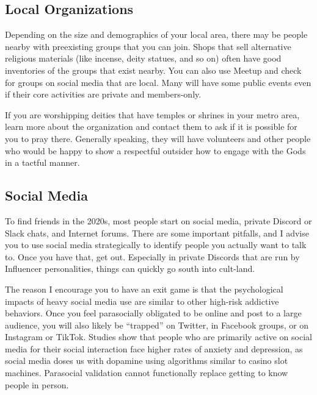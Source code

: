 \documentclass[
]{book}
\begin{document}
\hypertarget{local-organizations}{%
\subsection{Local Organizations}\label{local-organizations}}

Depending on the size and demographics of your local area, there may be people nearby with preexisting groups that you can join. Shops that sell alternative religious materials (like incense, deity statues, and so on) often have good inventories of the groups that exist nearby. You can also use Meetup and check for groups on social media that are local. Many will have some public events even if their core activities are private and members-only.

If you are worshipping deities that have temples or shrines in your metro area, learn more about the organization and contact them to ask if it is possible for you to pray there. Generally speaking, they will have volunteers and other people who would be happy to show a respectful outsider how to engage with the Gods in a tactful manner.

\hypertarget{social-media}{%
\subsection{Social Media}\label{social-media}}

To find friends in the 2020s, most people start on social media, private Discord or Slack chats, and Internet forums. There are some important pitfalls, and I advise you to use social media strategically to identify people you actually want to talk to. Once you have that, get out. Especially in private Discords that are run by Influencer personalities, things can quickly go south into cult-land.

The reason I encourage you to have an exit game is that the psychological impacts of heavy social media use are similar to other high-risk addictive behaviors. Once you feel parasocially obligated to be online and post to a large audience, you will also likely be ``trapped'' on Twitter, in Facebook groups, or on Instagram or TikTok. Studies show that people who are primarily active on social media for their social interaction face higher rates of anxiety and depression, as social media doses us with dopamine using algorithms similar to casino slot machines. Parasocial validation cannot functionally replace getting to know people in person.
\end{document}
